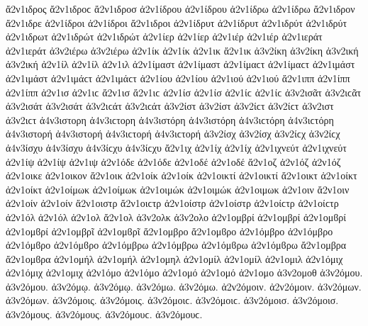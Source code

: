{ἄ2ν1ιδρος ἄ2ν1ιδροϲ   %
ἄ2ν1ιδροσ
ἀ2ν1ίδρου ἀ2ν1ίδρου
ἀ2ν1ίδρω ἀ2ν1ίδρω
ἄ2ν1ιδρον
ἄ2ν1ιδρε
ἀ2ν1ίδροι ἀ2ν1ίδροι
ἄ2ν1ιδροι
ἀ2ν1ίδρυτ ἀ2ν1ίδρυτ   %
ἀ2ν1ιδρύτ ἀ2ν1ιδρύτ
ἀ2ν1ιδρωτ   %
ἀ2ν1ιδρώτ ἀ2ν1ιδρώτ   %
ἀ2ν1ίερ ἀ2ν1ίερ   %
ἀ2ν1ιέρ ἀ2ν1ιέρ
ἀ2ν1ιεράτ ἀ2ν1ιεράτ   %
ἀ3ν2ιέρω ἀ3ν2ιέρω   %
ἀ2ν1ίκ ἀ2ν1ίκ   %
ἀ2ν1ικ
ἄ2ν1ικ   %
ἀ3ν2ίκη ἀ3ν2ίκη   %
ἀ3ν2ική ἀ3ν2ική
ἀ2ν1ίλ ἀ2ν1ίλ   %
ἀ2ν1ιλ
ἀ2ν1ίμαστ ἀ2ν1ίμαστ ἀ2ν1ίμαϲτ ἀ2ν1ίμαϲτ   %
ἀ2ν1ιμάστ ἀ2ν1ιμάστ ἀ2ν1ιμάϲτ ἀ2ν1ιμάϲτ
ἀ2ν1ίου ἀ2ν1ίου   %
ἀ2ν1ιού ἀ2ν1ιού
ἄ2ν1ιππ   %
ἀ2ν1ίππ ἀ2ν1ίππ
ἀ2ν1ισ ἀ2ν1ιϲ   %
ἄ2ν1ισ ἄ2ν1ιϲ   %
ἀ2ν1ίσ ἀ2ν1ίσ ἀ2ν1ίϲ ἀ2ν1ίϲ
ἀ3ν2ισᾶτ ἀ3ν2ιϲᾶτ   %
ἀ3ν2ισάτ ἀ3ν2ισάτ ἀ3ν2ιϲάτ ἀ3ν2ιϲάτ
ἀ3ν2ίστ ἀ3ν2ίστ ἀ3ν2ίϲτ ἀ3ν2ίϲτ   %
ἀ3ν2ιστ ἀ3ν2ιϲτ
ἀ4ν3ιστορη ἀ4ν3ιϲτορη   %
ἀ4ν3ιστόρη ἀ4ν3ιστόρη ἀ4ν3ιϲτόρη ἀ4ν3ιϲτόρη   %
ἀ4ν3ιστορή ἀ4ν3ιστορή ἀ4ν3ιϲτορή ἀ4ν3ιϲτορή
ἀ3ν2ίσχ ἀ3ν2ίσχ ἀ3ν2ίϲχ ἀ3ν2ίϲχ   %
ἀ4ν3ίσχυ ἀ4ν3ίσχυ ἀ4ν3ίϲχυ ἀ4ν3ίϲχυ   %
ἄ2ν1ιχ   %
ἀ2ν1ίχ ἀ2ν1ίχ
ἀ2ν1ιχνεύτ ἀ2ν1ιχνεύτ   %
ἀ2ν1ίψ ἀ2ν1ίψ   %
ἀ2ν1ιψ
ἀ2ν1όδε ἀ2ν1όδε   %
ἀ2ν1οδέ ἀ2ν1οδέ
ἄ2ν1οζ   %
ἀ2ν1όζ ἀ2ν1όζ
ἀ2ν1οικε   %
ἀ2ν1οικον   %
ἄ2ν1οικ   %
ἀ2ν1οίκ ἀ2ν1οίκ
ἀ2ν1οικτί ἀ2ν1οικτί   %
ἄ2ν1οικτ   %
ἀ2ν1οίκτ ἀ2ν1οίκτ
ἀ2ν1οίμωκ ἀ2ν1οίμωκ   %
ἀ2ν1οιμώκ ἀ2ν1οιμώκ
ἀ2ν1οιμωκ   %
ἀ2ν1οιν   %
ἄ2ν1οιν   %
ἀ2ν1οίν ἀ2ν1οίν
ἄ2ν1οιστρ ἄ2ν1οιϲτρ   %
ἀ2ν1οίστρ ἀ2ν1οίστρ ἀ2ν1οίϲτρ ἀ2ν1οίϲτρ
ἀ2ν1όλ ἀ2ν1όλ   %
ἀ2ν1ολ
ἄ2ν1ολ   %
ἀ3ν2ολκ   %
ἀ3ν2ολο   %
ἀ2ν1ομβρί ἀ2ν1ομβρί ἀ2ν1ομϐρί ἀ2ν1ομϐρί %
ἀ2ν1ομβρῖ ἀ2ν1ομϐρῖ
ἄ2ν1ομβρο ἄ2ν1ομϐρο %
ἀ2ν1όμβρο ἀ2ν1όμβρο ἀ2ν1όμϐρο ἀ2ν1όμϐρο
ἀ2ν1όμβρω ἀ2ν1όμβρω ἀ2ν1όμϐρω ἀ2ν1όμϐρω
ἄ2ν1ομβρα ἄ2ν1ομϐρα
ἀ2ν1ομήλ ἀ2ν1ομήλ   %
ἀ2ν1ομηλ
ἀ2ν1ομίλ ἀ2ν1ομίλ   %
ἀ2ν1ομιλ
ἀ2ν1όμιχ ἀ2ν1όμιχ   %
ἀ2ν1ομιχ
ἀ2ν1όμο ἀ2ν1όμο   %
ἀ2ν1ομό ἀ2ν1ομό
ἀ2ν1ομο   %
ἀ3ν2ομοθ   %
ἀ3ν2όμου. ἀ3ν2όμου.   %
ἀ3ν2όμῳ. ἀ3ν2όμῳ.
ἀ3ν2όμω. ἀ3ν2όμω.
ἀ2ν2όμοιν. ἀ2ν2όμοιν.
ἀ3ν2όμων. ἀ3ν2όμων.
ἀ3ν2όμοις. ἀ3ν2όμοις. ἀ3ν2όμοιϲ. ἀ3ν2όμοιϲ.
ἀ3ν2όμοισ. ἀ3ν2όμοισ.
ἀ3ν2όμους. ἀ3ν2όμους. ἀ3ν2όμουϲ. ἀ3ν2όμουϲ.
}
